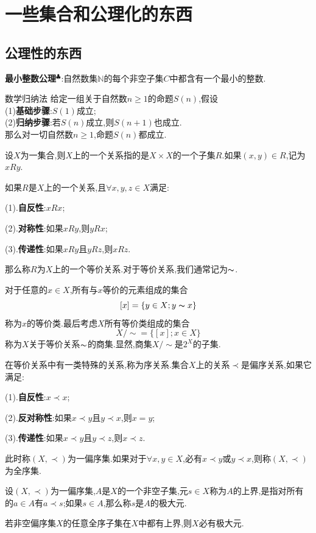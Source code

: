 \section{一些集合和公理化的东西}
\subsection{公理性的东西}
\textbf{最小整数公理}$^\clubsuit $:自然数集$\mathbb{N}$的每个非空子集$C$中都含有一个最小的整数.\par
\begin{Theorem}{数学归纳法}
给定一组关于自然数$n\geqslant 1$的命题$S(n)$,假设\\
    (1)\textbf{基础步骤}:$S(1)$成立;\\
    (2)\textbf{归纳步骤}:若$S(n)$成立,则$S(n+1)$也成立.\\
    那么对一切自然数$n\geqslant 1$,命题$S(n)$都成立.
\end{Theorem}
设$X$为一集合,则$X$上的一个关系指的是$X\times X$的一个子集$R$.如果$(x,y)\in R$,记为$xRy$.
\begin{Definition}
如果$R$是$X$上的一个关系,且$\forall x,y,z\in X$满足:\par
(1).\textbf{自反性}:$xRx$;\par
(2).\textbf{对称性}:如果$xRy$,则$yRx$;\par
(3).\textbf{传递性}:如果$xRy$且$yRz$,则$xRz$.\par
那么称$R$为$X$上的一个等价关系.对于等价关系,我们通常记为$\thicksim $.
\end{Definition}
对于任意的$x\in X$,所有与$x$等价的元素组成的集合
$$
[x]=\{y\in X;y\thicksim x\}
$$
称为$x$的等价类.最后考虑$X$所有等价类组成的集合
$$
X/\sim=\{[x];x\in X\}
$$
称为$X$关于等价关系$\thicksim$的商集.显然,商集$X/\sim$是$2^{X}$的子集.\par
在等价关系中有一类特殊的关系,称为序关系.集合$X$上的关系$\prec $是偏序关系,如果它满足:\par
(1).\textbf{自反性}:$x\prec  x$;\par
(2).\textbf{反对称性}:如果$x\prec  y$且$y\prec  x$,则$x=y$;\par
(3).\textbf{传递性}:如果$x\prec  y$且$y\prec  z$,则$x\prec  z$.\par
此时称$(X,\prec)$为一偏序集.如果对于$\forall x,y\in X$,必有$x\prec y$或$y\prec x$,则称$(X,\prec)$为全序集.\par
设$(X,\prec)$为一偏序集,$A$是$X$的一个非空子集,元$s\in X$称为$A$的上界,是指对所有的$a\in A$有$a\prec s$;如果$s\in A$,那么称$s$是$A$的极大元.
\begin{tcolorbox}[colback=KuangNei,colframe=BianKuang,title=\textbf{zorn引理},sharpish corners]
    若非空偏序集$X$的任意全序子集在$X$中都有上界,则$X$必有极大元.
\end{tcolorbox}
